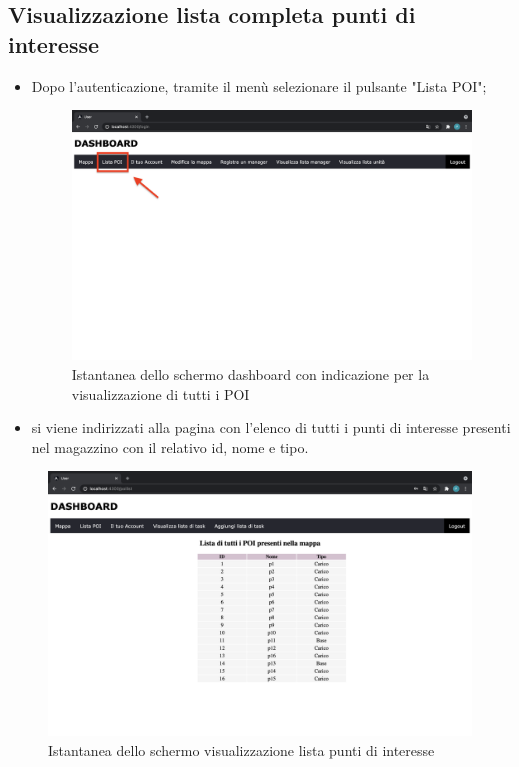 \subsection{Visualizzazione lista completa punti di interesse}
\begin{itemize}
    \item Dopo l'autenticazione, tramite il menù selezionare il pulsante "Lista POI";
    \begin{figure}[H]
        \centering
        \includegraphics[scale=0.12]{res/images/dashboard2.png}
        \caption{Istantanea dello schermo dashboard con indicazione per la visualizzazione di tutti i POI}
    \end{figure}
    \item si viene indirizzati alla pagina con l'elenco di tutti i punti di interesse presenti nel magazzino con il relativo id, nome e tipo.

\end{itemize}

\begin{figure}[H]
    \centering
    \includegraphics[scale=0.12]{res/images/listpoi_user.png}
    \caption{Istantanea dello schermo visualizzazione lista punti di interesse}
\end{figure}

